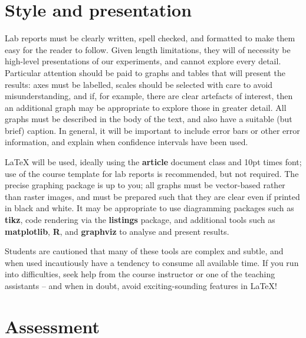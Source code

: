 \documentclass[a4paper,10pt]{article}
\begin{document}
\section*{Style and presentation}

Lab reports must be clearly written, spell checked, and formatted to make them
easy for the reader to follow.
Given length limitations, they will of necessity be high-level presentations
of our experiments, and cannot explore every detail.
Particular attention should be paid to graphs and tables that will present the
results: axes must be labelled, scales should be selected with care to avoid
misunderstanding, and if, for example, there are clear artefacts of interest,
then an additional graph may be appropriate to explore those in greater
detail.
All graphs must be described in the body of the text, and also have a
suitable (but brief) caption.
In general, it will be important to include error bars or other error
information, and explain when confidence intervals have been used.

LaTeX will be used, ideally using the \textbf{article} document class and 10pt
times font; use of the course template for lab reports is recommended, but not
required.
The precise graphing package is up to you; all graphs must be vector-based
rather than raster images, and must be prepared such that they are clear even
if printed in black and white.
It may be appropriate to use diagramming packages such as \textbf{tikz}, code
rendering via the \textbf{listings} package,  and additional tools such as
\textbf{matplotlib}, \textbf{R}, and \textbf{graphviz} to analyse and present
results.

Students are cautioned that many of these tools are complex and subtle, and
when used incautiously have a tendency to consume all available time.
If you run into difficulties, seek help from the course instructor or one of
the teaching assistants -- and when in doubt, avoid exciting-sounding features
in LaTeX!

\section*{Assessment}
\end{document}
